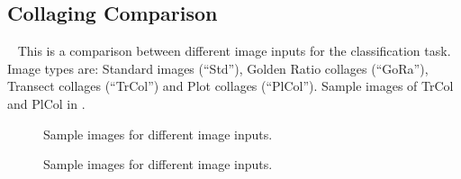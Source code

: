 \subsection{Collaging Comparison}
~\label{sec:MinorTests:sub:CollComp}
%
This is a comparison between different image inputs for the classification task. 
Image types are: Standard images (``Std''), Golden Ratio collages (``GoRa''), Transect collages (``TrCol'') and Plot collages (``PlCol'').
Sample images of TrCol and PlCol in .

\begin{multicols}{2}
    \begin{minipage}{\columnwidth}
        \begin{figure}[H]
            \vspace{2.1\baselineskip}
            \centering

            \vspace{1.78\baselineskip}
            \caption{Sample images for different image inputs.
                    }
            \space\label{fig:Ap_CollComp_Smpl}
        \end{figure}%
    \end{minipage}

    \begin{minipage}{\columnwidth}
        \begin{figure}[H]
            \centering
            
            \caption{Sample images for different image inputs.
                    }
            \space\label{fig:Ap_CollComp_FinRes}
        \end{figure}%
    \end{minipage}
\end{multicols}


